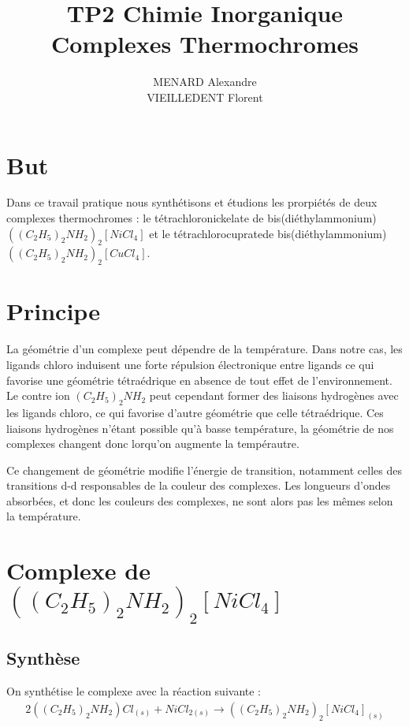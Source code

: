 \documentclass[12pt]{article}
\title{\textbf{TP2 Chimie Inorganique} \\ Complexes Thermochromes}
\author{MENARD Alexandre \\ VIEILLEDENT Florent}
\begin{document}
\maketitle

\section{But}
Dans ce travail pratique nous synthétisons et étudions les prorpiétés de deux complexes thermochromes : le tétrachloronickelate de bis(diéthylammonium) $((C_2H_5)_2NH_2)_2[NiCl_4]$ et le tétrachlorocupratede bis(diéthylammonium) $((C_2H_5)_2NH_2)_2[CuCl_4]$.

\section{Principe}
La géométrie d'un complexe peut dépendre de la température. 
Dans notre cas, les ligands chloro induisent une forte répulsion électronique entre ligands ce qui favorise une géométrie tétraédrique en absence de tout effet de l'environnement.
Le contre ion $(C_2H_5)_2NH_2$ peut cependant former des liaisons hydrogènes avec les ligands chloro, ce qui favorise d'autre géométrie que celle tétraédrique.
Ces liaisons hydrogènes n'étant possible qu'à basse température, la géométrie de nos complexes changent donc lorqu'on augmente la tempérautre.

Ce changement de géométrie modifie l'énergie de transition, notamment celles des transitions d-d responsables de la couleur des complexes.
Les longueurs d'ondes absorbées, et donc les couleurs des complexes, ne sont alors pas les mêmes selon la température.

\newpage

\section{Complexe  de$((C_2H_5)_2NH_2)_2[NiCl_4]$}
\subsection{Synthèse}
On synthétise le complexe avec la réaction suivante :
\begin{align}
    2((C_2H_5)_2NH_2)Cl_{(s)} + NiCl_{2(s)} \longrightarrow ((C_2H_5)_2NH_2)_2[NiCl_4]_{(s)}
\label{eq1:Premiere synthese}
\end{align}
\end{document}
